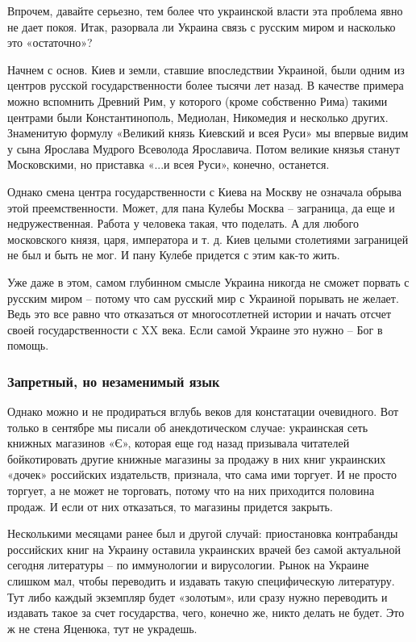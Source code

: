 Впрочем, давайте серьезно, тем более что украинской власти эта проблема явно не
дает покоя. Итак, разорвала ли Украина связь с русским миром и насколько это
«остаточно»?

Начнем с основ. Киев и земли, ставшие впоследствии Украиной, были одним из
центров русской государственности более тысячи лет назад. В качестве примера
можно вспомнить Древний Рим, у которого (кроме собственно Рима) такими центрами
были Константинополь, Медиолан, Никомедия и несколько других. Знаменитую
формулу «Великий князь Киевский и всея Руси» мы впервые видим у сына Ярослава
Мудрого Всеволода Ярославича. Потом великие князья станут Московскими, но
приставка «...и всея Руси», конечно, останется. 

Однако смена центра государственности с Киева на Москву не означала обрыва этой
преемственности. Может, для пана Кулебы Москва – заграница, да еще и
недружественная. Работа у человека такая, что поделать. А для любого
московского князя, царя, императора и т. д. Киев целыми столетиями заграницей
не был и быть не мог. И пану Кулебе придется с этим как-то жить. 

Уже даже в этом, самом глубинном смысле Украина никогда не сможет порвать с
русским миром – потому что сам русский мир с Украиной порывать не желает. Ведь
это все равно что отказаться от многосотлетней истории и начать отсчет своей
государственности с XX века. Если самой Украине это нужно – Бог в помощь.  

\subsubsection{Запретный, но незаменимый язык }

Однако можно и не продираться вглубь веков для констатации очевидного. Вот
только в сентябре мы писали об анекдотическом случае: украинская сеть книжных
магазинов «Є», которая еще год назад призывала читателей бойкотировать другие
книжные магазины за продажу в них книг украинских «дочек» российских
издательств, признала, что сама ими торгует. И не просто торгует, а не может не
торговать, потому что на них приходится половина продаж. И если от них
отказаться, то магазины придется закрыть.

Несколькими месяцами ранее был и другой случай: приостановка контрабанды
российских книг на Украину оставила украинских врачей без самой актуальной
сегодня литературы – по иммунологии и вирусологии. Рынок на Украине слишком
мал, чтобы переводить и издавать такую специфическую литературу. Тут либо
каждый экземпляр будет «золотым», или сразу нужно переводить и издавать такое
за счет государства, чего, конечно же, никто делать не будет. Это ж не стена
Яценюка, тут не украдешь. 


